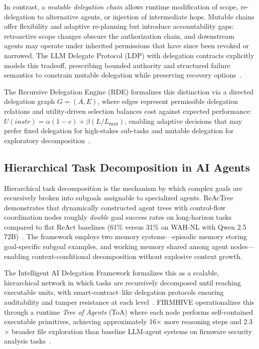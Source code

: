 In contrast, a \emph{mutable delegation chain} allows runtime modification of scope, re-delegation to alternative agents, or injection of intermediate hops. Mutable chains offer flexibility and adaptive re-planning but introduce accountability gaps: retroactive scope changes obscure the authorization chain, and downstream agents may operate under inherited permissions that have since been revoked or narrowed. The LLM Delegate Protocol (LDP) with delegation contracts explicitly models this tradeoff, prescribing bounded authority and structured failure semantics to constrain mutable delegation while preserving recovery options~\cite{provparadox2025}.

The Recursive Delegation Engine (RDE) formalizes this distinction via a directed delegation graph $G = (A, E)$, where edges represent permissible delegation relations and utility-driven selection balances cost against expected performance: $U(instr) = \alpha(1 - c) + \beta (L / L_{\max})$, enabling adaptive decisions that may prefer fixed delegation for high-stakes sub-tasks and mutable delegation for exploratory decomposition~\cite{rde2025}.

\subsection{Hierarchical Task Decomposition in AI Agents}
\label{sec:decomposition}

Hierarchical task decomposition is the mechanism by which complex goals are recursively broken into subgoals assignable to specialized agents. ReAcTree demonstrates that dynamically constructed agent trees with control-flow coordination nodes roughly \emph{double} goal success rates on long-horizon tasks compared to flat ReAct baselines (61\% versus 31\% on WAH-NL with Qwen 2.5 72B)~\cite{reactree2025}. The framework employs two memory systems---episodic memory storing goal-specific subgoal examples, and working memory shared among agent nodes---enabling context-conditional decomposition without explosive context growth.

The Intelligent AI Delegation Framework formalizes this as a scalable, hierarchical network in which tasks are recursively decomposed until reaching executable units, with smart-contract--like delegation protocols ensuring auditability and tamper resistance at each level~\cite{intelligentai2025}. FIRMHIVE operationalizes this through a runtime \emph{Tree of Agents} (ToA) where each node performs self-contained executable primitives, achieving approximately 16$\times$ more reasoning steps and 2.3$\times$ broader file exploration than baseline LLM-agent systems on firmware security analysis tasks~\cite{firmhive2025}.

